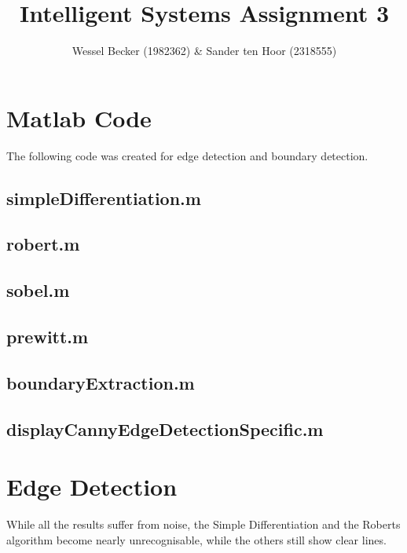 \documentclass[10pt,a4paper]{article}
\begin{document}
\title{Intelligent Systems Assignment 3}
\author{Wessel Becker (1982362) \& Sander ten Hoor (2318555)}
\maketitle

\section{Matlab Code}
The following code was created for edge detection and boundary detection.

\subsection{simpleDifferentiation.m}


\subsection{robert.m}


\subsection{sobel.m}


\subsection{prewitt.m}


\subsection{boundaryExtraction.m}
\label{list:boundaryExtraction}

\subsection{displayCannyEdgeDetectionSpecific.m}


\section{Edge Detection}
While all the results suffer from noise, the Simple Differentiation and the Roberts algorithm become nearly unrecognisable, while the others still show clear lines.
\end{document}
